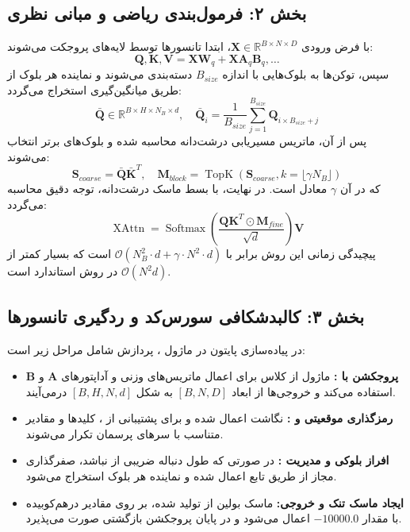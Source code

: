 \subsection*{بخش ۲: فرمول‌بندی ریاضی و مبانی نظری }
با فرض ورودی $\mathbf{X} \in \mathbb{R}^{B \times N \times D}$، ابتدا تانسورها توسط لایه‌های  پروجکت می‌شوند:
\begin{equation}
    \mathbf{Q}, \mathbf{K}, \mathbf{V} = \mathbf{X} \mathbf{W}_q + \mathbf{X} \mathbf{A}_q \mathbf{B}_q, \dots
\end{equation}
سپس، توکن‌ها به بلوک‌هایی با اندازه $B_{size}$ دسته‌بندی می‌شوند و نماینده هر بلوک از طریق میانگین‌گیری استخراج می‌گردد:
\begin{equation}
    \bar{\mathbf{Q}} \in \mathbb{R}^{B \times H \times N_B \times d}, \quad \bar{\mathbf{Q}}_i = \frac{1}{B_{size}} \sum_{j=1}^{B_{size}} \mathbf{Q}_{i \times B_{size} + j}
\end{equation}
پس از آن، ماتریس مسیریابی درشت‌دانه  محاسبه شده و بلوک‌های برتر انتخاب می‌شوند:
\begin{equation}
    \mathbf{S}_{coarse} = \bar{\mathbf{Q}} \bar{\mathbf{K}}^T, \quad \mathbf{M}_{block} = \operatorname{TopK}\left(\mathbf{S}_{coarse}, k = \lfloor \gamma N_B \rfloor \right)
\end{equation}
که در آن $\gamma$ معادل  است. در نهایت، با بسط ماسک درشت‌دانه، توجه دقیق محاسبه می‌گردد:
\begin{equation}
    \operatorname{XAttn} = \operatorname{Softmax}\left(\frac{\mathbf{Q}\mathbf{K}^T \odot \mathbf{M}_{fine}}{\sqrt{d}}\right) \mathbf{V}
\end{equation}
پیچیدگی زمانی این روش برابر با $\mathcal{O}(N_B^2 \cdot d + \gamma \cdot N^2 \cdot d)$ است که بسیار کمتر از $\mathcal{O}(N^2 d)$ در روش استاندارد است.

\subsection*{بخش ۳: کالبدشکافی سورس‌کد و ردگیری تانسورها }
در پیاده‌سازی پایتون در ماژول ، پردازش شامل مراحل زیر است:
\begin{itemize}
    \item \textbf{پروجکشن با :} ماژول از کلاس  برای اعمال ماتریس‌های وزنی و آداپتورهای $\mathbf{A}$ و $\mathbf{B}$ استفاده می‌کند و خروجی‌ها از ابعاد $[B, N, D]$ به شکل $[B, H, N, d]$ درمی‌آیند.
    \item \textbf{رمزگذاری موقعیتی  و :} نگاشت  اعمال شده و برای پشتیبانی از ، کلیدها و مقادیر متناسب با سرهای پرسمان  تکرار می‌شوند.
    \item \textbf{افراز بلوکی و مدیریت :} در صورتی که طول دنباله ضریبی از  نباشد، صفرگذاری مجاز  از طریق تابع  اعمال شده و نماینده هر بلوک استخراج می‌شود.
    \item \textbf{ایجاد ماسک تنک و خروجی:} ماسک بولین از  تولید شده، بر روی مقادیر درهم‌کوبیده  با مقدار $-10000.0$ اعمال می‌شود و در پایان پروجکشن بازگشتی صورت می‌پذیرد.
\end{itemize}

